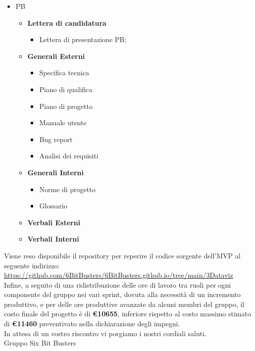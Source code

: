 \begin{titlepage}
        \begin{itemize}
                \item PB
                \begin{itemize}
                        \item \textbf{Lettera di candidatura}
                        \begin{itemize}
                                \item Lettera di presentazione PB;
                        \end{itemize}
                        \item \textbf{Generali Esterni}
                        \begin{itemize}
                                \item Specifica tecnica
                                \item Piano di qualifica
                                \item Piano di progetto
                                \item Manuale utente
                                \item Bug report
                                \item Analisi dei requisiti
                        \end{itemize}
                        \item \textbf{Generali Interni}
                        \begin{itemize}
                                \item Norme di progetto
                                \item Glossario
                        \end{itemize}
                        \item \textbf{Verbali Esterni}
                        \item \textbf{Verbali Interni}
                \end{itemize}
        \end{itemize}

        

        \noindent Viene reso disponibile il repository per reperire il codice sorgente dell'MVP al seguente indirizzo: 
        \url{https://github.com/6BitBusters/6BitBusters.github.io/tree/main/3Dataviz}\\

        \noindent Infine, a seguito di una ridistribuzione delle ore di lavoro tra ruoli per ogni componente del gruppo nei vari sprint, dovuta alla necessità di un incremento produttivo, e per delle ore produttive avanzate da alcuni membri del gruppo, il costo finale del progetto è di \textbf{\euro 10655}, inferiore rispetto al
        costo massimo stimato di \textbf{\euro 11460} preventivato nella dichiarazione degli impegni.\\
	
	\noindent In attesa di un vostro riscontro vi porgiamo i nostri cordiali saluti.\\
        Gruppo Six Bit Busters
	
\end{titlepage}
